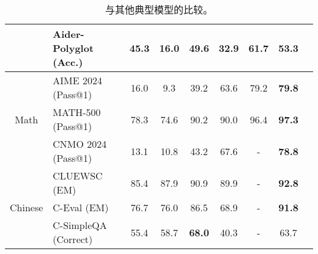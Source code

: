 \begin{table}[h]
\begin{tabular}{@{}c l | c  c  c | c c |c c@{}}
    & Aider-Polyglot {\tiny (Acc.)} & 45.3&16.0& 49.6 & 32.9 & \textbf{61.7}&53.3\\
    \midrule
    \multirow{3}{*}{Math} & AIME 2024 {\tiny (Pass@1)}  & 16.0 & 9.3 & 39.2 & 63.6 & 79.2 & \textbf{79.8} \\
    & MATH-500 {\tiny (Pass@1)} &78.3 & 74.6&90.2 & 90.0 & 96.4 & \textbf{97.3} \\
    & CNMO 2024 {\tiny (Pass@1)} & 13.1 & 10.8 &43.2 & 67.6 & - & \textbf{78.8} \\
    \midrule
    \multirow{3}{*}{Chinese} & CLUEWSC {\tiny (EM)}&  85.4 & 87.9 & 90.9 & 89.9 & - &\textbf{92.8}\\
    & C-Eval {\tiny (EM)} & 76.7 & 76.0 & 86.5 & 68.9 & - & \textbf{91.8}\\
     & C-SimpleQA {\tiny (Correct)}  & 55.4 & 58.7 & \textbf{68.0} & 40.3 & -& 63.7 \\
    \bottomrule
    \end{tabular}
    \caption{ \dsri{} 与其他典型模型的比较。 }
    \label{tab:main}
\end{table}
